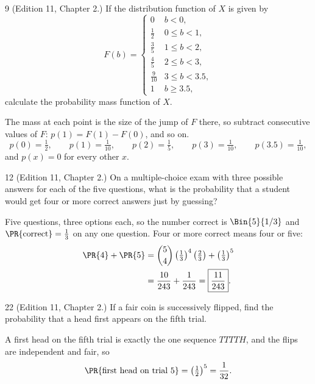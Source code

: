 \documentclass[11pt]{article}
\begin{document}
\begin{problem}{9}
  (Edition 11, Chapter 2.) If the distribution function of $X$ is given by
  \[
    F(b) =
    \begin{cases}
      0            & b < 0,\\
      \frac{1}{2}  & 0 \le b < 1,\\
      \frac{3}{5}  & 1 \le b < 2,\\
      \frac{4}{5}  & 2 \le b < 3,\\
      \frac{9}{10} & 3 \le b < 3.5,\\
      1            & b \ge 3.5,
    \end{cases}
  \]
  calculate the probability mass function of $X$.
\end{problem}
The mass at each point is the size of the jump of $F$ there, so subtract consecutive
values of $F$: $p(1) = F(1) - F(0)$, and so on.
\[
  p(0) = \tfrac{1}{2},\qquad
  p(1) = \tfrac{1}{10},\qquad
  p(2) = \tfrac{1}{5},\qquad
  p(3) = \tfrac{1}{10},\qquad
  p(3.5) = \tfrac{1}{10},
\]
and $p(x) = 0$ for every other $x$.

\begin{problem}{12}
  (Edition 11, Chapter 2.) On a multiple-choice exam with three possible
  answers for each of the five questions, what is the probability that a
  student would get four or more correct answers just by guessing?
\end{problem}
Five questions, three options each, so the number correct is $\Bin{5}{1/3}$ and
$\PR{\text{correct}} = \tfrac{1}{3}$ on any one question. Four or more correct means
four or five:
\begin{align*}
  \PR{4} + \PR{5}
    &= \binom{5}{4}\left(\tfrac{1}{3}\right)^{4}\left(\tfrac{2}{3}\right)
       + \left(\tfrac{1}{3}\right)^{5}\\
    &= \frac{10}{243} + \frac{1}{243}
     = \boxed{\frac{11}{243}}.
\end{align*}

\begin{problem}{22}
  (Edition 11, Chapter 2.) If a fair coin is successively flipped, find the
  probability that a head first appears on the fifth trial.
\end{problem}
A first head on the fifth trial is exactly the one sequence $TTTTH$, and the flips are
independent and fair, so
\[
  \PR{\text{first head on trial }5} = \left(\tfrac{1}{2}\right)^{5} = \frac{1}{32}.
\]
\end{document}
